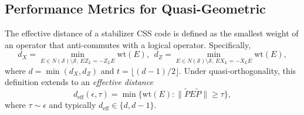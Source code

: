 \documentclass{iopjournal}
\theoremstyle{thmstyleone}%
\theoremstyle{thmstyletwo}%
\theoremstyle{thmstylethree}%
\begin{document}
\subsection{Performance Metrics for Quasi-Geometric}


The effective distance of a stabilizer CSS code is defined as the smallest weight of an 
operator that anti-commutes with a logical operator. Specifically,
\begin{equation}
d_X=\min_{E\in N(\mathcal S)\setminus\mathcal S,\, E Z_L=-Z_L E}\!\!\mathrm{wt}(E), ~~d_Z=\min_{E\in N(\mathcal S)\setminus\mathcal S,\, E X_L=-X_L E}\!\!\mathrm{wt}(E),
\end{equation}
where $d=\min(d_X,d_Z)$ and $t=\lfloor(d-1)/2\rfloor$. Under quasi-orthogonality, this definition 
extends to an \emph{effective distance}
\begin{equation}
d_{\mathrm{eff}}(\epsilon,\tau)
= \min\bigl\{\mathrm{wt}(E): \|\tilde{P}E\tilde{P}\|\ge\tau\bigr\}, \label{distance eff}
\end{equation}
where $\tau\!\sim\!\epsilon$ and typically $d_{\mathrm{eff}}\!\in\!\{d,d-1\}$.  
\end{document}
